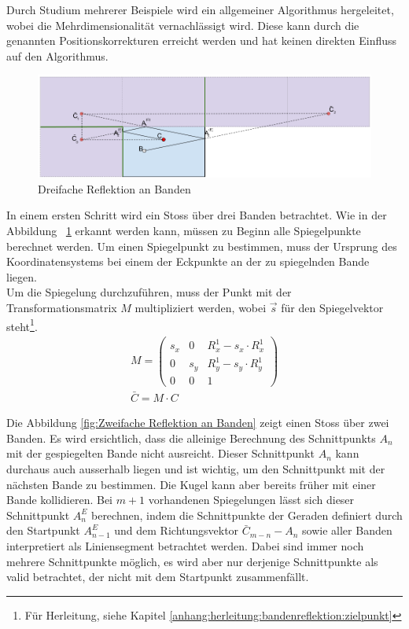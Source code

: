 Durch Studium mehrerer Beispiele wird ein allgemeiner Algorithmus hergeleitet, wobei die Mehrdimensionalität vernachlässigt
wird. Diese kann durch die genannten Positionskorrekturen erreicht werden und hat keinen direkten Einfluss auf
den Algorithmus.
\begin{figure}[h!]
    \begin{center}
        \includegraphics[width=1\linewidth]{../common/03_billiard_ai/resources/49_rail_reflection_3.png}
    \end{center}
    \caption{Dreifache Reflektion an Banden}
    \label{fig:Dreifache Reflektion an Banden}
\end{figure}
In einem ersten Schritt wird ein Stoss über drei Banden betrachtet. Wie in der Abbildung ~\ref{fig:Dreifache Reflektion an Banden} erkannt werden kann,
müssen zu Beginn alle Spiegelpunkte berechnet werden.
Um einen Spiegelpunkt zu bestimmen, muss der Ursprung des Koordinatensystems bei einem der Eckpunkte an der zu
spiegelnden Bande liegen.\\
Um die Spiegelung durchzuführen, muss der Punkt mit der Transformationsmatrix $M$ multipliziert werden, wobei $\vec{s}$
für den Spiegelvektor steht\footnote{Für Herleitung, siehe Kapitel \ref{anhang:herleitung:bandenreflektion:zielpunkt}}.
\begin{align}
    M = \begin{pmatrix}s_x & 0 & R^1_x - s_x \cdot R^1_x \\ 0 & s_y & R^1_y - s_y \cdot R^1_y \\ 0 & 0 & 1\end{pmatrix}\\
    \bar{C} = M \cdot C
\end{align}

Die Abbildung \ref{fig:Zweifache Reflektion an Banden} zeigt einen Stoss über zwei Banden.
Es wird ersichtlich, dass die alleinige Berechnung des Schnittpunkts $A_n$ mit der gespiegelten Bande
nicht ausreicht. Dieser Schnittpunkt $A_n$ kann durchaus auch ausserhalb liegen und ist wichtig,
um den Schnittpunkt mit der nächsten Bande zu bestimmen. Die Kugel kann aber bereits früher
mit einer Bande kollidieren. Bei $m + 1$ vorhandenen Spiegelungen lässt sich dieser Schnittpunkt $A_n^E$ berechnen, indem
die Schnittpunkte der Geraden definiert durch den Startpunkt $A_{n-1}^E$ und dem Richtungsvektor $\bar{C}_{m-n} - A_n$
sowie aller Banden interpretiert als Liniensegment betrachtet werden. Dabei sind immer noch mehrere Schnittpunkte möglich, es wird aber nur derjenige Schnittpunkte
als valid betrachtet, der nicht mit dem Startpunkt zusammenfällt.

